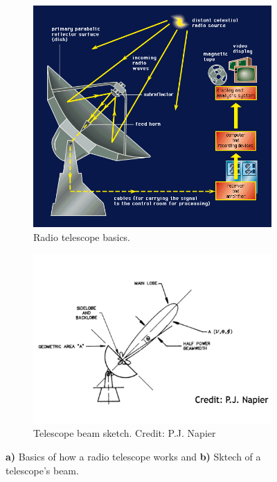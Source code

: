 \begin{figure}[H]
    \centering
    \begin{subfigure}[t]{0.49\textwidth}
        \centering
        \includegraphics[width=\textwidth]{Astronomy/radio_telescope.png}
        \caption{Radio telescope basics.}
        \label{subfig:radio_telescope}
    \end{subfigure}
    \hfill
    \begin{subfigure}[t]{0.49\textwidth}
       \centering
       \includegraphics[width=\textwidth]{Astronomy/beamwidth_sketch_cropped.png}
       \caption{Telescope beam sketch. Credit: P.J. Napier}
       \label{subfig:beamwidth}
    \end{subfigure}
    \caption[Radio telescope basics]{\textbf{a)} Basics of how a radio telescope works and \textbf{b)} Sktech of a telescope's beam.}
    \label{fig:telescope_info}
\end{figure}


